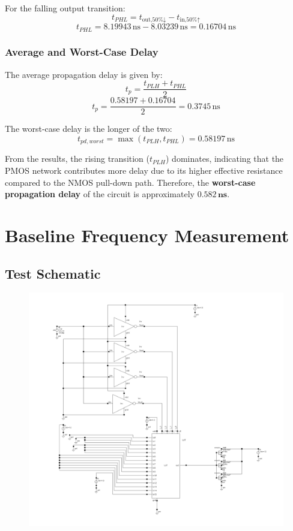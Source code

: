 \documentclass[12pt]{article}
\begin{document}
For the falling output transition:
\[
t_{PHL} = t_{\text{out,50\%↓}} - t_{\text{in,50\%↑}}
\]
\[
t_{PHL} = 8.19943\,\text{ns} - 8.03239\,\text{ns} = 0.16704\,\text{ns}
\]

\subsubsection*{Average and Worst-Case Delay}

The average propagation delay is given by:
\[
t_p = \frac{t_{PLH} + t_{PHL}}{2}
\]
\[
t_p = \frac{0.58197 + 0.16704}{2} = 0.3745\,\text{ns}
\]

The worst-case delay is the longer of the two:
\[
t_{pd,worst} = \max(t_{PLH}, t_{PHL}) = 0.58197\,\text{ns}
\]

From the results, the rising transition (\(t_{PLH}\)) dominates, indicating that the PMOS network contributes more delay due to its higher effective resistance compared to the NMOS pull-down path. 
Therefore, the \textbf{worst-case propagation delay} of the circuit is approximately \(\mathbf{0.582\,ns}\).


\newpage

\section{Baseline Frequency Measurement}
\subsection{Test Schematic}

\begin{figure}[H]
    \centering
    \includegraphics[width=0.8\linewidth]{writeup//figures/lut_delay_testbench.png}
    \caption{}
\end{figure}
\end{document}
